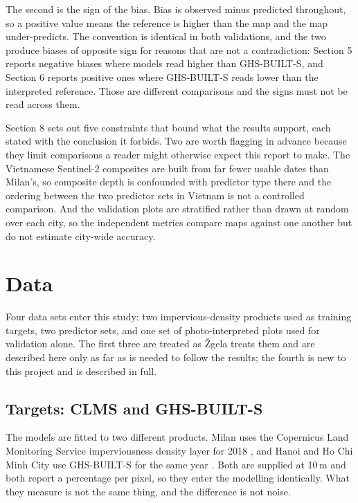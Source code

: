 \documentclass[11pt,a4paper]{article}
\begin{document}
The second is the sign of the bias. Bias is observed minus predicted throughout,
so a positive value means the reference is higher than the map and the map
under-predicts. The convention is identical in both validations, and the two
produce biases of opposite sign for reasons that are not a contradiction:
Section 5 reports negative biases where models read higher than GHS-BUILT-S, and
Section 6 reports positive ones where GHS-BUILT-S reads lower than the
interpreted reference. Those are different comparisons and the signs must not be
read across them.

Section 8 sets out five constraints that bound what the results support, each
stated with the conclusion it forbids. Two are worth flagging in advance because
they limit comparisons a reader might otherwise expect this report to make. The
Vietnamese Sentinel-2 composites are built from far fewer usable dates than
Milan's, so composite depth is confounded with predictor type there and the
ordering between the two predictor sets in Vietnam is not a controlled
comparison. And the validation plots are stratified rather than drawn at random
over each city, so the independent metrics compare maps against one another but
do not estimate city-wide accuracy.

\section{Data}

Four data sets enter this study: two impervious-density products used as
training targets, two predictor sets, and one set of photo-interpreted plots
used for validation alone. The first three are treated as Žgela treats them and
are described here only as far as is needed to follow the results; the fourth is
new to this project and is described in full.

\subsection{Targets: CLMS and GHS-BUILT-S}

The models are fitted to two different products. Milan uses the Copernicus Land
Monitoring Service imperviousness density layer for 2018 \cite{clms2018imd}, and Hanoi and Ho
Chi Minh City use GHS-BUILT-S for the same year \cite{pesaresi2023ghsl}. Both are supplied at 10\,m and both
report a percentage per pixel, so they enter the modelling identically. What
they measure is not the same thing, and the difference is not noise.
\end{document}
